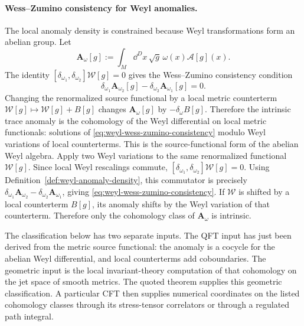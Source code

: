 \paragraph{Wess--Zumino consistency for Weyl anomalies.}
The local anomaly density is constrained because Weyl transformations form an
abelian group.  Let
\[
  \mathbf A_\omega[g]
  :=
  \int_M\dd^D x\,\sqrt g\,\omega(x)\mathcal A[g](x).
\]
The identity
\([\delta_{\omega_1},\delta_{\omega_2}]\mathcal W[g]=0\) gives the
Wess--Zumino consistency condition
\begin{equation}
  \delta_{\omega_1}\mathbf A_{\omega_2}[g]
  -
  \delta_{\omega_2}\mathbf A_{\omega_1}[g]
  =
  0.
  \label{eq:weyl-wess-zumino-consistency}
\end{equation}
Changing the renormalized source functional by a local metric counterterm
\(\mathcal W[g]\mapsto\mathcal W[g]+B[g]\) changes
\(\mathbf A_\omega[g]\) by \(-\delta_\omega B[g]\).  Therefore the intrinsic
trace anomaly is the cohomology of the Weyl differential on local metric
functionals: solutions of
\eqref{eq:weyl-wess-zumino-consistency} modulo Weyl variations of local
counterterms.
This is the source-functional form of the abelian Weyl algebra.  Apply two
Weyl variations to the same renormalized functional \(\mathcal W[g]\).
Since local Weyl rescalings commute,
\([\delta_{\omega_1},\delta_{\omega_2}]\mathcal W[g]=0\).  Using
Definition~\ref{def:weyl-anomaly-density}, this commutator is precisely
\(\delta_{\omega_1}\mathbf A_{\omega_2}
-\delta_{\omega_2}\mathbf A_{\omega_1}\), giving
\eqref{eq:weyl-wess-zumino-consistency}.  If
\(\mathcal W\) is shifted by a local counterterm \(B[g]\), its anomaly shifts
by the Weyl variation of that counterterm.  Therefore only the cohomology class
of \(\mathbf A_\omega\) is intrinsic.

The classification below has two separate inputs.  The QFT input has just
been derived from the metric source functional: the anomaly is a cocycle for
the abelian Weyl differential, and local counterterms add coboundaries.  The
geometric input is the local invariant-theory computation of that cohomology
on the jet space of smooth metrics.  The quoted theorem supplies this
geometric classification.  A particular CFT then supplies numerical
coordinates on the listed cohomology classes through its stress-tensor
correlators or through a regulated path integral.

